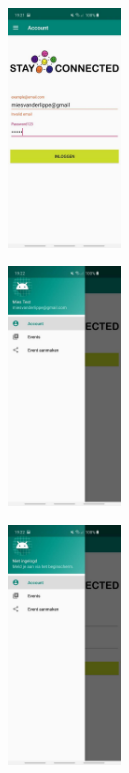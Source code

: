 \documentclass[dutch]{report}
\begin{document}
	\begin{minipage}{0.33\textwidth}
		\begin{center}
			\includegraphics[width=3cm]{images/FOTOINVALIDEMAIL.jpg}		
		\end{center}
	\end{minipage}
	\begin{minipage}{0.34\textwidth}
		\begin{center}
			\includegraphics[width=3cm]{images/FOTONAAMINDRAWER.jpg}
		\end{center}
	\end{minipage}
	\begin{minipage}{0.33\textwidth}
		\begin{center}
			\includegraphics[width=3cm]{images/FOTOGEENNAAMINDRAWER.jpg}
		\end{center}
	\end{minipage}
	
\end{document}
